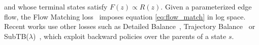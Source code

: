 and whose terminal states satisfy $F(z)\varpropto R(z)$. Given a parameterized edge flow, the Flow Matching loss~\citep{bengio2021flow} imposes  
equation \autoref{eq:flow_match} in log space. 
Recent  works use other losses such as Detailed Balance~\citep{bengio2023gflownet}, Trajectory Balance~\citep{malkin2022trajectory}
or SubTB($\lambda$)~\citep{madan2023learning}, 
which exploit backward policies  over the parents of a state $s$. 




